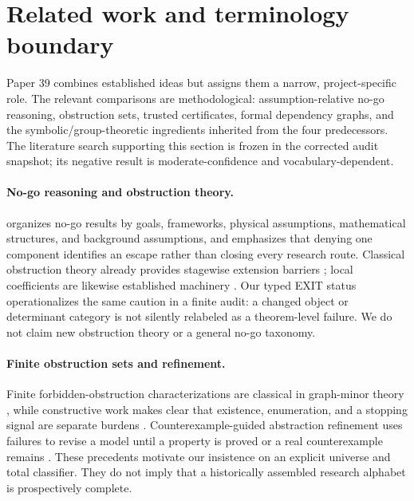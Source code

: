 \section{Related work and terminology boundary}
\label{sec:related}

Paper 39 combines established ideas but assigns them a narrow, project-specific
role.  The relevant comparisons are methodological: assumption-relative
no-go reasoning, obstruction sets, trusted certificates, formal dependency
graphs, and the symbolic/group-theoretic ingredients inherited from the four
predecessors.  The literature search supporting this section is frozen in the
corrected audit snapshot; its negative result is moderate-confidence and
vocabulary-dependent.

\paragraph{No-go reasoning and obstruction theory.}
\citet{Dardashti2021NoGo} organizes no-go results by goals, frameworks,
physical assumptions, mathematical structures, and background assumptions,
and emphasizes that denying one component identifies an escape rather than
closing every research route.  Classical obstruction theory already provides
stagewise extension barriers \citep{Olum1950Obstructions}; local coefficients
are likewise established machinery \citep{KwasikSun2018Local}.  Our typed EXIT
status operationalizes the same caution in a finite audit: a changed object or
determinant category is not silently relabeled as a theorem-level failure.  We
do not claim new obstruction theory or a general no-go taxonomy.

\paragraph{Finite obstruction sets and refinement.}
Finite forbidden-obstruction characterizations are classical in graph-minor
theory \citep{RobertsonSeymour2004GraphMinorsXX}, while constructive work makes
clear that existence, enumeration, and a stopping signal are separate burdens
\citep{CattellEtAl2000ObstructionSets}.  Counterexample-guided abstraction
refinement uses failures to revise a model until a property is proved or a real
counterexample remains \citep{ClarkeEtAl2000CEGAR}.  These precedents motivate
our insistence on an explicit universe and total classifier.  They do not imply
that a historically assembled research alphabet is prospectively complete.

